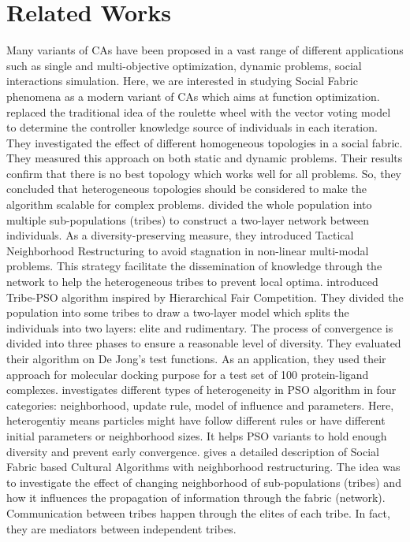 \documentclass{llncs}
\begin{document}
\section{Related Works}
Many variants of CAs have been proposed in a vast range of different applications such as single and multi-objective optimization, dynamic problems, social interactions simulation. Here, we are interested in studying Social Fabric phenomena as a modern variant of CAs which aims at function optimization. \newline
\cite{ali2011boosting} replaced the traditional idea of the roulette wheel with the vector voting model to determine the controller knowledge source of individuals in each iteration. They investigated the effect of different homogeneous topologies in a social fabric. They measured this approach on both static and dynamic problems. Their results confirm that there is no best topology which works well for all problems. So, they concluded that heterogeneous topologies should be considered to make the algorithm scalable for complex problems.\newline
\cite{ali2012socio} divided the whole population into multiple sub-populations (tribes) to construct a two-layer network between individuals. As a diversity-preserving measure, they introduced Tactical Neighborhood Restructuring to avoid stagnation in non-linear multi-modal problems. This strategy facilitate the dissemination of knowledge through the network to help the heterogeneous tribes to prevent local optima.\newline
\cite{chen2006tribe} introduced Tribe-PSO algorithm inspired by Hierarchical Fair Competition. They divided the population into some tribes to draw a two-layer model which splits the individuals into two layers: elite and rudimentary. The process of convergence is divided into three phases to ensure a reasonable level of diversity. They evaluated their algorithm on De Jong's test functions. As an application, they used their approach for molecular docking purpose for a test set of 100 protein-ligand complexes.
\newline
\cite{de2009heterogeneous} investigates different types of heterogeneity in PSO algorithm in four categories: neighborhood, update rule, model of influence and parameters. Here, heterogentiy means particles might have follow different rules or have different initial parameters or neighborhood sizes. It helps PSO variants to hold enough diversity and prevent early convergence.\newline
\cite{ali2016leveraged} gives a detailed description of Social Fabric based Cultural Algorithms with neighborhood restructuring. The idea was to investigate the effect of changing neighborhood of sub-populations (tribes) and how it influences the propagation of information through the fabric (network). Communication between tribes happen through the elites of each tribe. In fact, they are mediators between independent tribes.
\end{document}
